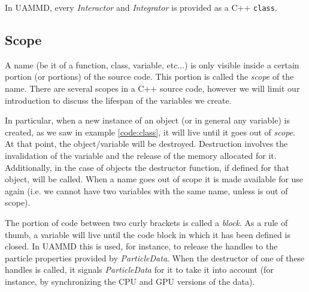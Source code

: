 \documentclass[twoside,openright,titlepage,numbers=noenddot,%
headinclude,footinclude,cleardoublepage=empty,abstract=on,
BCOR=5mm,fontsize=11pt, dvipsnames, paper=b5
]{scrreprt}
\def\ucpp{uammd_cpp_lexer.py:UAMMDCppLexer -x}
\newcommand{\uammd}{\gls{UAMMD}\xspace}
\newcommand{\gpu}{\gls{GPU}\xspace}
\begin{document}
In \uammd, every \emph{Interactor} and \emph{Integrator} is provided as a C++ \texttt{class}.

\subsection*{Scope}
A name (be it of a function, class, variable, etc...) is only visible inside a certain portion (or portions) of the source code. This portion is called the \emph{scope} of the name. There are several scopes in a C++ source code, however we will limit our introduction to discuss the lifespan of the variables we create.

In particular, when a new instance of an object (or in general any variable) is created, as we saw in example \ref{code:class}, it will live until it goes out of \emph{scope}. At that point, the object/variable will be destroyed.
Destruction involves the invalidation of the variable and the release of the memory allocated for it. Additionally, in the case of objects the destructor function, if defined for that object, will be called. When a name goes out of scope it is made available for use again (i.e. we cannot have two variables with the same name, unless is out of scope).

The portion of code between two curly brackets is called a \emph{block}. As a rule of thumb, a variable will live until the code block in which it has been defined is closed. In \uammd this is used, for instance, to release the handles to the particle properties provided by \emph{ParticleData}. When the destructor of one of these handles is called, it signals \emph{ParticleData} for it to take it into account (for instance, by synchronizing the CPU and \gpu versions of the data).
\end{document}
